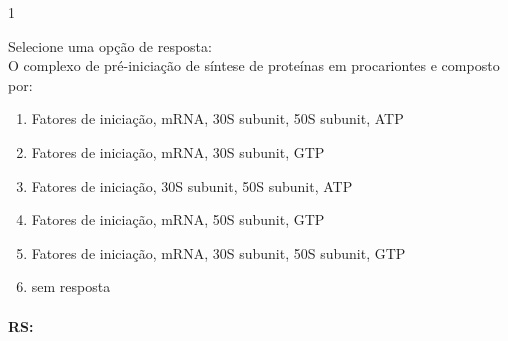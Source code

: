 \documentclass[\mainfilename]{subfiles}
\begin{document}
\begin{questionBox}1{}

    Selecione uma opção de resposta:\\

    O complexo de pré-iniciação de síntese de proteínas em procariontes e composto por:
    \begin{enumerate}[label={\alph*)}]
        \item Fatores de iniciação, mRNA, 30S subunit, 50S subunit, ATP
        \item Fatores de iniciação, mRNA, 30S subunit, GTP
        \item Fatores de iniciação, 30S subunit, 50S subunit, ATP
        \item Fatores de iniciação, mRNA, 50S subunit, GTP
        \item Fatores de iniciação, mRNA, 30S subunit, 50S subunit, GTP
        \item  sem resposta
    \end{enumerate}

    \paragraph{RS:}
    
\end{questionBox}
\end{document}
